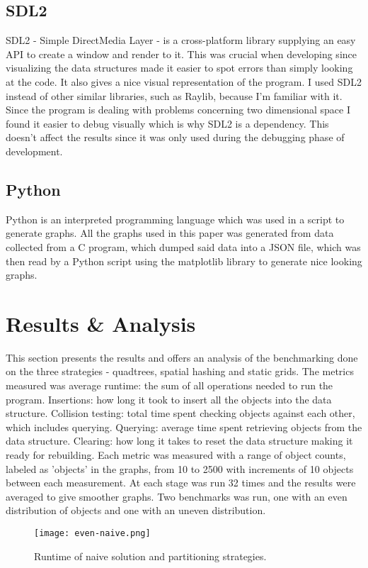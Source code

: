 \documentclass[a4paper, 12pt]{article}
\begin{document}
\subsection{SDL2}
SDL2 - Simple DirectMedia Layer - is a cross-platform library supplying an easy
API to create a window and render to it. This was crucial when developing since
visualizing the data structures made it easier to spot errors than simply
looking at the code. It also gives a nice visual representation of the program.
I used SDL2 instead of other similar libraries, such as Raylib, because I'm
familiar with it. Since the program is dealing with problems concerning two
dimensional space I found it easier to debug visually which is why SDL2 is a
dependency. This doesn't affect the results since it was only used during the
debugging phase of development.

\subsection{Python}
Python is an interpreted programming language which was used in a script to
generate graphs. All the graphs used in this paper was generated from data
collected from a C program, which dumped said data into a JSON file, which was
then read by a Python script using the matplotlib library to generate nice
looking graphs.

\section{Results \& Analysis}
This section presents the results and offers an analysis of the benchmarking
done on the three strategies - quadtrees, spatial hashing and static grids. The
metrics measured was average runtime: the sum of all operations needed to run
the program. Insertions: how long it took to insert all the objects into the
data structure. Collision testing: total time spent checking objects against
each other, which includes querying. Querying: average time spent retrieving
objects from the data structure. Clearing: how long it takes to reset the data
structure making it ready for rebuilding. Each metric was measured with a range
of object counts, labeled as 'objects' in the graphs, from 10 to 2500 with
increments of 10 objects between each measurement. At each stage was run 32 times
and the results were averaged to give smoother graphs. Two benchmarks was run,
one with an even distribution of objects and one with an uneven distribution.

\begin{figure}[H]
    \centering
    \texttt{[image: even-naive.png]}
    \caption{Runtime of naive solution and partitioning strategies.}
    \label{fig:naive}
\end{figure}
\end{document}
